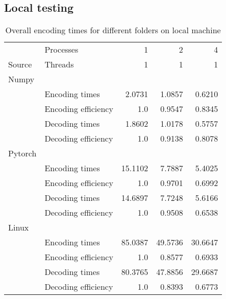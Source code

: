 \subsection{Local testing}
\begin{table}[!h]
	\caption{Overall encoding times for different folders on local machine}
	\begin{tabular}{llrrr}
		\toprule
		\diagbox{}{} & Processes &     1 &        2 &        4 \\
		Source & Threads &     1 &        1 &        1 \\
		\toprule
		Numpy & &  & \\
		\toprule
		& Encoding times &  2.0731 &  1.0857 &  0.6210 \\
		\midrule
		& Encoding efficiency &  1.0 &  0.9547 &  0.8345 \\
		\midrule
		& Decoding times & 1.8602 &  1.0178 &  0.5757 \\
		\midrule
		& Decoding efficiency &  1.0 &  0.9138 &  0.8078 \\
		\toprule
		Pytorch & &  & \\
		\toprule
		& Encoding times &  15.1102 &  7.7887 &  5.4025 \\
		\midrule
		& Encoding efficiency  &  1.0 &  0.9701 &  0.6992 \\
		\midrule
		& Decoding times  & 14.6897 &  7.7248 &  5.6166 \\
		\midrule
		& Decoding efficiency&  1.0 &  0.9508 &  0.6538 \\
		\toprule
		Linux & &  & \\
		\toprule
		& Encoding times &  85.0387 &  49.5736 &  30.6647 \\
		\midrule
		& Encoding efficiency &  1.0 &  0.8577 &  0.6933 \\
		\midrule
		& Decoding times&  80.3765 &  47.8856 &  29.6687 \\
		\midrule
		& Decoding efficiency&  1.0 &  0.8393 &  0.6773 \\
		\bottomrule
	\end{tabular}
\end{table}